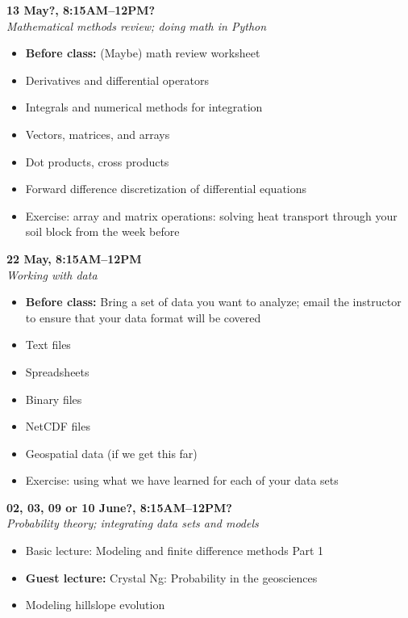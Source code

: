 \documentclass[10pt,a4paper]{amsart}
\begin{document}
\begin{minipage}{\linewidth}
\noindent \textbf{13 May?, 8:15AM--12PM?}\\
\textit{Mathematical methods review; doing math in Python}
\begin{itemize}
 \item \textbf{Before class:} (Maybe) math review worksheet
 \item Derivatives and differential operators
 \item Integrals and numerical methods for integration
 \item Vectors, matrices, and arrays
 \item Dot products, cross products
 \item Forward difference discretization of differential equations
 \item Exercise: array and matrix operations: solving heat transport through your soil block from the week before
\end{itemize}
\vspace{12pt}
\end{minipage}

{
\begin{minipage}{\linewidth}
\noindent \textbf{22 May, 8:15AM--12PM}\\
\textit{Working with data}
\begin{itemize}
 \item \textbf{Before class:} Bring a set of data you want to analyze; email the instructor to ensure that your data format will be covered
 \item Text files
 \item Spreadsheets
 \item Binary files
 \item NetCDF files
 \item Geospatial data (if we get this far)
 \item Exercise: using what we have learned for each of your data sets
\end{itemize}
\vspace{12pt}
\end{minipage}
}

\begin{minipage}{\linewidth}
\noindent \textbf{02, 03, 09 or 10 June?, 8:15AM--12PM?}\\
\textit{Probability theory; integrating data sets and models}
\begin{itemize}
 \item Basic lecture: Modeling and finite difference methods Part 1
 \item \textbf{Guest lecture:} Crystal Ng: Probability in the geosciences
 \item Modeling hillslope evolution
\end{itemize}
\vspace{12pt}
\end{minipage}
\end{document}
